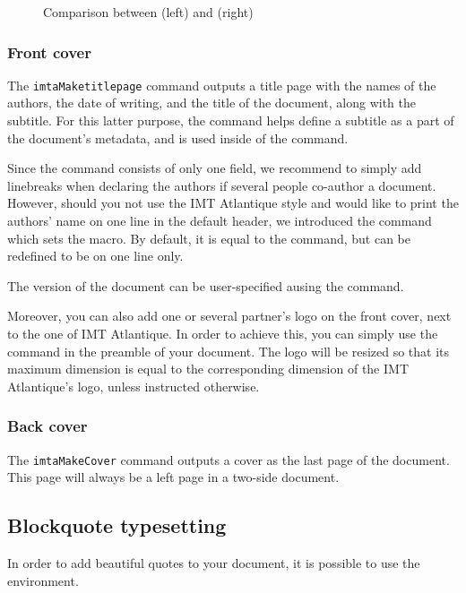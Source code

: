 \documentclass{report}
\begin{document}
\begin{figure}[H]
    \centering
    \fbox{\imtaLogo{5cm}}
    \fbox{\imtaLogoTikz{5cm}}
    \caption{Comparison between  (left) and  (right)}
    \label{fig:imtaLogo}
\end{figure}


\subsubsection{Front cover}
The \texttt{imtaMaketitlepage} command outputs a title page with the names of the authors, the date of writing, and the title of the document, along with the subtitle.
For this latter purpose, the  command helps define a subtitle as a part of the document's metadata, and %
is used inside of the  command.

Since the  command consists of only one field, we recommend to simply add linebreaks when declaring the authors if several people co-author a document. 
However, should you not use the IMT Atlantique style and would like to print the authors' name on one line in the default header, we introduced the  command which sets the  macro. 
By default, it is equal to the  command, but can be redefined to be on one line only.

The version of the document can be user-specified ausing the  command.

Moreover, you can also add one or several partner's logo on the front cover, next to the one of IMT Atlantique. 
In order to achieve this, you can simply use the  command in the preamble of your document. 
The logo will be resized so that its maximum dimension is equal to the corresponding dimension of the IMT Atlantique's logo, unless instructed otherwise.


\subsubsection{Back cover}

The \texttt{imtaMakeCover} command outputs a cover as the last page of the document.
This page will always be a left page in a two-side document.


\subsection{Blockquote typesetting}
\label{sec:core:quote}
In order to add beautiful quotes to your document, it is possible to use the  environment.
\end{document}
